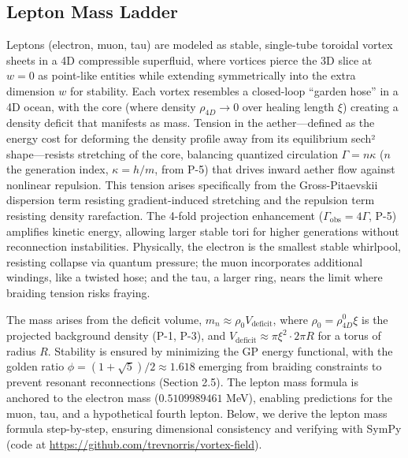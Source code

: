 \subsection{Lepton Mass Ladder}
\label{sec:leptons}

Leptons (electron, muon, tau) are modeled as stable, single-tube toroidal vortex sheets in a 4D compressible superfluid, where vortices pierce the 3D slice at $w=0$ as point-like entities while extending symmetrically into the extra dimension $w$ for stability. Each vortex resembles a closed-loop ``garden hose'' in a 4D ocean, with the core (where density $\rho_{4D} \to 0$ over healing length $\xi$) creating a density deficit that manifests as mass. Tension in the aether—defined as the energy cost for deforming the density profile away from its equilibrium sech² shape—resists stretching of the core, balancing quantized circulation $\Gamma = n \kappa$ ($n$ the generation index, $\kappa = h / m$, from P-5) that drives inward aether flow against nonlinear repulsion. This tension arises specifically from the Gross-Pitaevskii dispersion term resisting gradient-induced stretching and the repulsion term resisting density rarefaction. The 4-fold projection enhancement ($\Gamma_{\text{obs}} = 4\Gamma$, P-5) amplifies kinetic energy, allowing larger stable tori for higher generations without reconnection instabilities. Physically, the electron is the smallest stable whirlpool, resisting collapse via quantum pressure; the muon incorporates additional windings, like a twisted hose; and the tau, a larger ring, nears the limit where braiding tension risks fraying.

The mass arises from the deficit volume, $m_n \approx \rho_0 V_{\text{deficit}}$, where $\rho_0 = \rho_{4D}^0 \xi$ is the projected background density (P-1, P-3), and $V_{\text{deficit}} \approx \pi \xi^2 \cdot 2\pi R$ for a torus of radius $R$. Stability is ensured by minimizing the GP energy functional, with the golden ratio $\phi = (1 + \sqrt{5})/2 \approx 1.618$ emerging from braiding constraints to prevent resonant reconnections (Section 2.5). The lepton mass formula is anchored to the electron mass ($0.5109989461$ MeV), enabling predictions for the muon, tau, and a hypothetical fourth lepton. Below, we derive the lepton mass formula step-by-step, ensuring dimensional consistency and verifying with SymPy (code at \url{https://github.com/trevnorris/vortex-field}).

